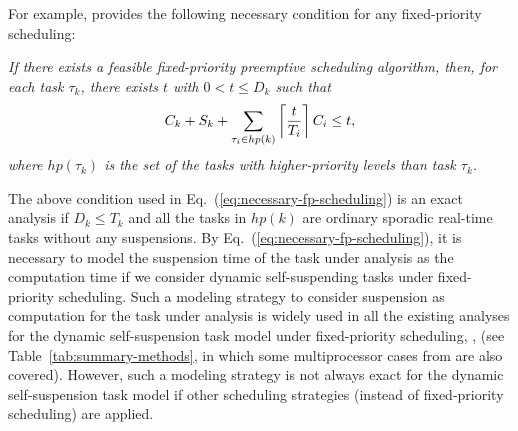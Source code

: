 For example, \cite[Theorem 3]{huangpass:dac2015} provides the following necessary condition for any fixed-priority scheduling: 

\emph{ If there exists a feasible fixed-priority preemptive scheduling
  algorithm, then, for each task $\tau_k$, there exists $t$ with $0 < t \leq D_k$ such that}
  \begin{equation}
    \label{eq:necessary-fp-scheduling}
    C_k+S_k + \sum_{\tau_i \in
      hp(k)} \left\lceil{\frac{t}{T_i}}\right\rceil C_i   \leq t,
  \end{equation}
\emph{where $hp(\tau_k)$ is the set of the tasks with higher-priority levels than task $\tau_k$.} 

The above condition used in Eq.~(\ref{eq:necessary-fp-scheduling}) is an exact analysis if $D_k \leq T_k$ and all the tasks in $hp(k)$ are ordinary sporadic real-time tasks without any suspensions. By Eq.~(\ref{eq:necessary-fp-scheduling}), it is necessary to model the suspension time of the task under analysis as the computation time if we consider dynamic self-suspending tasks under fixed-priority scheduling. Such a modeling strategy to consider suspension as computation for the task under analysis is widely used in all the existing analyses for the dynamic self-suspension task model under fixed-priority scheduling, \eg, \cite{LiuChen:rtss2014,huangpass:dac2015,MingLiRTCSA1994,RTCSA-KimCPKH95,RTAS-AudsleyB04,ECRTS-AudsleyB04,Liu:2000:RS:518501} (see Table~\ref{tab:summary-methods}, in which some multiprocessor cases from \cite{DBLP:conf/ecrts/LiuA13,DBLP:conf/ecrts/LiuCH014} are also covered). However, such a modeling strategy is not always exact for the dynamic self-suspension task model if other scheduling strategies (instead of fixed-priority scheduling) are applied.



